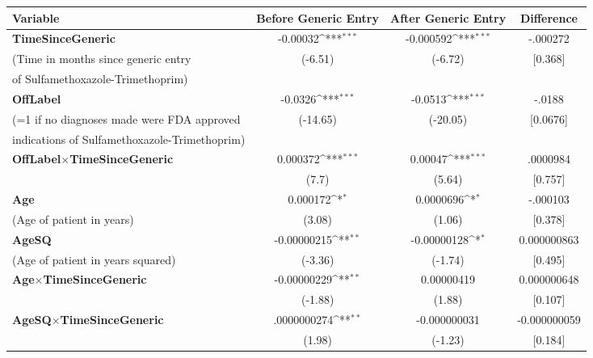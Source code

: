 \def\sym#1{\ifmmode^{#1}\else\(^{#1}\)\fi}
\begin{tabular}{l*{3}{c}}
\hline\hline
Variable            &\multicolumn{1}{c}{Before Generic Entry}&\multicolumn{1}{c}{After Generic Entry}&\multicolumn{1}{c}{Difference}\\
\hline
\textbf{TimeSinceGeneric}&                           -0.00032\sym{***}&   -0.000592\sym{***}&   -.000272\\
(Time in months since generic entry            &     (-6.51)         &     (-6.72)         &     [0.368]         \\
of Sulfamethoxazole-Trimethoprim)\\
[.5em]
\textbf{OffLabel}    &                                     -0.0326\sym{***}&     -0.0513\sym{***}&   -.0188\\
(=1 if no diagnoses made were FDA approved            &    (-14.65)         &    (-20.05)         &    [0.0676]         \\
indications of Sulfamethoxazole-Trimethoprim)\\
[.5em]
\textbf{OffLabel}$\times$\textbf{TimeSinceGeneric} &    0.000372\sym{***}&    0.00047\sym{***}&   .0000984\\
            &                                           (7.7)         &      (5.64)         &    [0.757]         \\
[.5em]
\textbf{Age}         &                      0.000172\sym{*}  &    0.0000696\sym{*}  &   -.000103\\
(Age of patient in years)            &      (3.08)         &      (1.06)         &    [0.378]         \\
[.5em]
\textbf{AgeSQ}       &                             -0.00000215\sym{**} & -0.00000128\sym{*}  &   0.000000863\\
(Age of patient in years squared)            &     (-3.36)         &     (-1.74)         &    [0.495]         \\
[.5em]
\textbf{Age}$\times$\textbf{TimeSinceGeneric}      & -0.00000229\sym{**} &  0.00000419         &   0.000000648\\
            &                                        (-1.88)         &      (1.88)         &    [0.107]         \\
[.5em]
\textbf{AgeSQ}$\times$\textbf{TimeSinceGeneric}    &    .0000000274\sym{**} &   -0.000000031         &   -0.000000059\\
            &                                           (1.98)         &     (-1.23)         &    [0.184]         \\

\end{tabular}
